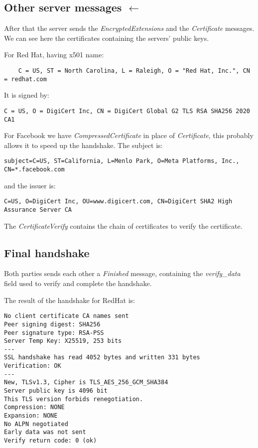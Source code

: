 \documentclass{article}
\begin{document}
\subsection{Other server messages $\leftarrow$}

After that the server sends the \emph{EncryptedExtensions} and
the \emph{Certificate} messages.
We can see here the certificates containing the servers' public keys.

For Red Hat, having x501 name:
\begin{verbatim}
	C = US, ST = North Carolina, L = Raleigh, O = "Red Hat, Inc.", CN = redhat.com
\end{verbatim}

It is signed by:

\begin{verbatim}
C = US, O = DigiCert Inc, CN = DigiCert Global G2 TLS RSA SHA256 2020 CA1
\end{verbatim}

For Facebook we have \emph{CompressedCertificate}
in place of \emph{Certificate}, this probably allows it to speed up the handshake.
The subject is:
\begin{verbatim}
subject=C=US, ST=California, L=Menlo Park, O=Meta Platforms, Inc., CN=*.facebook.com
\end{verbatim}

and the issuer is:

\begin{verbatim}
C=US, O=DigiCert Inc, OU=www.digicert.com, CN=DigiCert SHA2 High Assurance Server CA
\end{verbatim}

The \emph{CertificateVerify} contains the chain of certificates to verify the certificate.

\subsection{Final handshake}

Both parties sends each other a \emph{Finished} message,
containing the \emph{verify\_data} field used to verify and complete
the handshake.

The result of the handshake for RedHat is:

\begin{verbatim}
No client certificate CA names sent
Peer signing digest: SHA256
Peer signature type: RSA-PSS
Server Temp Key: X25519, 253 bits
---
SSL handshake has read 4052 bytes and written 331 bytes
Verification: OK
---
New, TLSv1.3, Cipher is TLS_AES_256_GCM_SHA384
Server public key is 4096 bit
This TLS version forbids renegotiation.
Compression: NONE
Expansion: NONE
No ALPN negotiated
Early data was not sent
Verify return code: 0 (ok)
\end{verbatim}
\end{document}
